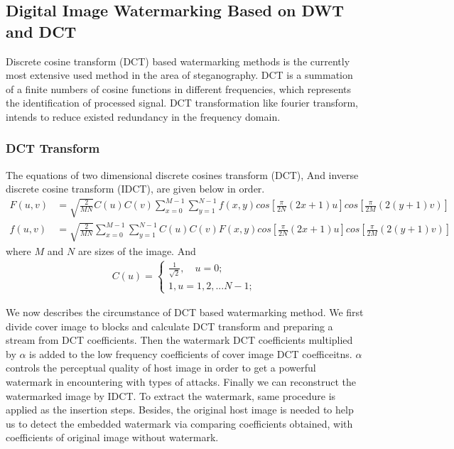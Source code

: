 \subsection{Digital Image Watermarking Based on DWT and DCT}
Discrete cosine transform (DCT) based watermarking methods is the currently most extensive used method in the area of steganography. DCT is a summation of a finite numbers of cosine functions in different frequencies, which represents the identification of processed signal. DCT transformation like
fourier transform, intends to reduce existed redundancy in the frequency domain.

\subsubsection{DCT Transform}

The equations of two dimensional discrete cosines transform (DCT), And inverse discrete cosine transform (IDCT), are given below in order.
\begin{align}
    F(u,v) &= \sqrt{\frac{2}{MN}}C(u)C(v)\sum_{x=0}^{M-1}\sum_{y=1}^{N-1}f(x,y)cos[\frac{\pi}{2N}(2x+1)u]cos[\frac{\pi}{2M}(2(y+1)v)] \\
    f(u,v) &= \sqrt{\frac{2}{MN}}\sum_{x=0}^{M-1}\sum_{y=1}^{N-1}C(u)C(v) F(x,y)cos[\frac{\pi}{2N}(2x+1)u]cos[\frac{\pi}{2M}(2(y+1)v)]
\end{align}
where $M$ and $N$ are sizes of the image. And 
\begin{align}
    C(u) = \begin{cases}
    \frac{1}{\sqrt{2}}, \quad u=0;\\
    1, u=1,2,...N-1;
    \end{cases}
\end{align}

We now describes the circumstance of DCT based watermarking method. We first divide cover image to blocks and calculate DCT transform and preparing a stream from DCT coefficients. Then the watermark DCT coefficients multiplied by $\alpha$ is added to the low frequency coefficients of cover image DCT coefficeitns. $\alpha$ controls the perceptual quality of host image in order to get a powerful watermark in encountering with types of attacks. Finally we can reconstruct the watermarked image by IDCT. To extract the watermark, same procedure is applied as the insertion steps. Besides, the original host image is needed to help us to detect the embedded watermark via comparing coefficients obtained, with coefficients of original image without watermark. \\

